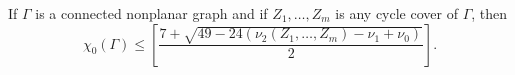 If $\Gamma$ is a connected nonplanar graph and if $Z_1, \ldots, Z_m$ is any cycle cover of $\Gamma$, then
$$\chi_0(\Gamma) \leq \left[ \frac{7 + \sqrt{49 - 24(\nu_2(Z_1, \ldots, Z_m) - \nu_1 + \nu_0)}}{2} \right].$$
